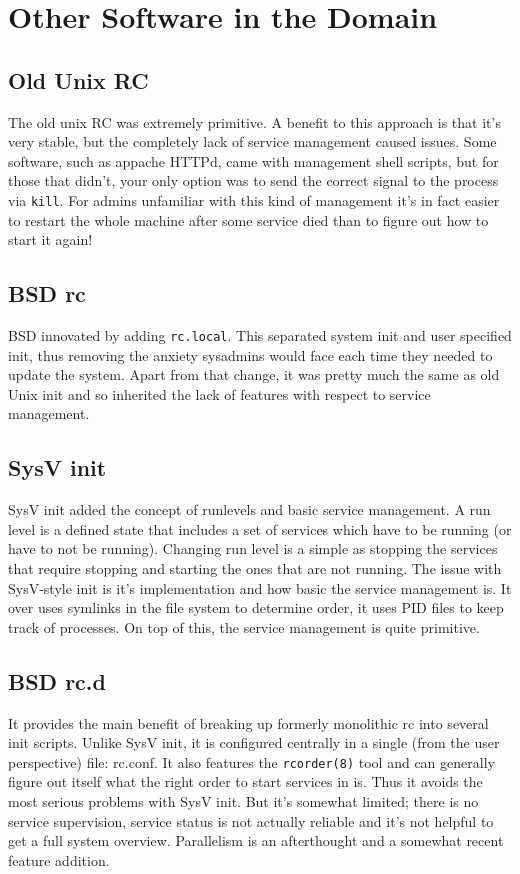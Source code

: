 \documentclass{article}
\begin{document}
\section{Other Software in the Domain}
\subsection{Old Unix RC}
\nocite{unix-ii}
The old unix RC was extremely primitive. A benefit to this approach is that it's very stable,
but the completely lack of service management caused issues. Some software, such as
appache HTTPd, came with management shell scripts, but
for those that didn't, your only option was to send the correct signal to the process
via \texttt{kill}. For admins unfamiliar with this kind of management it's in fact easier to
restart the whole machine after some service died than to figure out how to start it again!

\subsection{BSD rc}
BSD innovated by adding \texttt{rc.local}. This separated system init and user specified
init, thus removing the anxiety sysadmins would face each time they needed to update the
system. Apart from that change, it was pretty much the same as old Unix init
and so inherited the lack of features with respect to service management.


\subsection{SysV init}
SysV init added the concept of runlevels and basic 
service management. A run level is a defined state that includes
a set of services which have to be running (or have to not be running). Changing run level
is a simple as stopping the services that require stopping and starting the ones
that are not running. The issue with SysV-style init is it's implementation and
how basic the service management is. It over uses symlinks in the file system to determine order,
it uses PID files to keep track of processes. On top of this, the service management is
quite primitive.

\subsection{BSD rc.d}
It provides the main benefit of breaking up formerly monolithic rc into several
init scripts. Unlike SysV init, it is configured centrally in a single (from the user
perspective) file: rc.conf. It also features the \texttt{rcorder(8)} tool and can generally
figure out itself what the right order to start services in is. Thus it avoids the most
serious problems with SysV init. But it's somewhat limited;
there is no service supervision, service status is not actually reliable and it's not helpful
to get a full system overview. Parallelism is an afterthought and a somewhat recent feature
addition.
\end{document}
